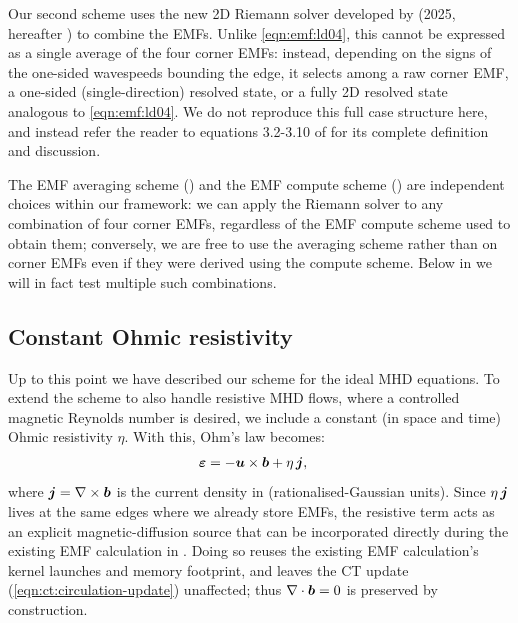 Our second scheme uses the new 2D Riemann solver developed by \citeauthor{Balsara25b} (2025, hereafter ) to combine the EMFs. Unlike \cref{eqn:emf:ld04}, this cannot be expressed as a single average of the four corner EMFs: instead, depending on the signs of the one-sided wavespeeds bounding the edge, it selects among a raw corner EMF, a one-sided (single-direction) resolved state, or a fully 2D resolved state analogous to \cref{eqn:emf:ld04}. We do not reproduce this full case structure here, and instead refer the reader to equations 3.2-3.10 of  for its complete definition and discussion.

The EMF averaging scheme () and the EMF compute scheme () are independent choices within our framework: we can apply the  Riemann solver to any combination of four corner EMFs, regardless of the EMF compute scheme used to obtain them; conversely, we are free to use the  averaging scheme rather than  on corner EMFs even if they were derived using the  compute scheme. Below in  we will in fact test multiple such combinations.

\subsection{Constant Ohmic resistivity}
\label{sec:methods:resistivity}

Up to this point we have described our scheme for the ideal MHD equations. To extend the scheme to also handle resistive MHD flows, where a controlled magnetic Reynolds number is desired, we include a constant (in space and time) Ohmic resistivity $\eta$. With this, Ohm's law becomes:
\begin{align}
    \bm{\varepsilon}
        &= -\bm{u}\times\bm{b} + \eta\, \bm{j}
    , \label{eqn:resistivity:ohms-law}
\end{align}
where $\bm{j} = \nabla\times\bm{b}$ is the current density in (rationalised-Gaussian units). Since $\eta\, \bm{j}$ lives at the same edges where we already store EMFs, the resistive term acts as an explicit magnetic-diffusion source that can be incorporated directly during the existing EMF calculation in . Doing so reuses the existing EMF calculation's kernel launches and memory footprint, and leaves the CT update (\cref{eqn:ct:circulation-update}) unaffected; thus $\nabla\cdot\bm{b} = 0$ is preserved by construction.

